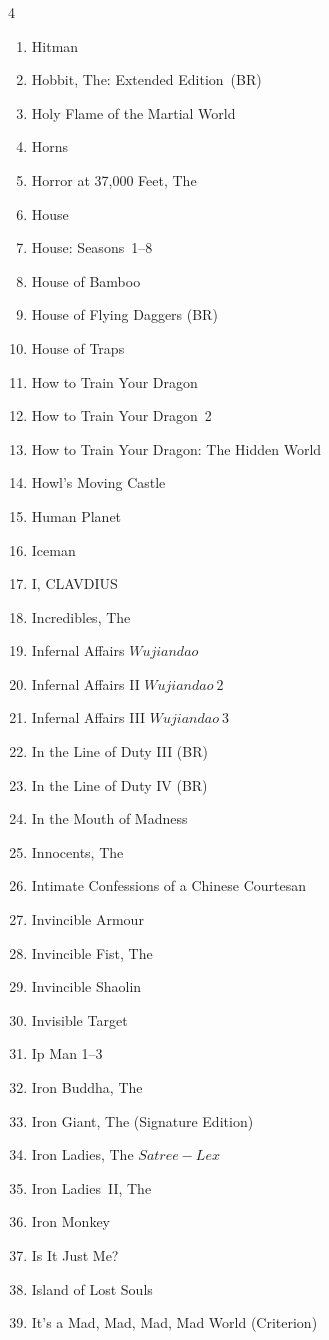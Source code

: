 \documentclass{article}
\begin{document}
\begin{multicols}{4}
\begin{enumerate}
\item Hitman
\item Hobbit, The: Extended Edition~(BR)
\item Holy Flame of the Martial World
\item Horns
\item Horror at 37,000 Feet, The
\item House
\item House: Seasons~1--8
\item House of Bamboo
\item House of Flying Daggers (BR)
\item House of Traps
\item How to Train Your Dragon
\item How to Train Your Dragon~2
\item How to Train Your Dragon: The Hidden World
\item Howl's Moving Castle
\item Human Planet
\item Iceman
\item I, CLAVDIUS
\item Incredibles, The
\item Infernal Affairs \(Wu jian dao\)
\item Infernal Affairs II  \(Wu jian dao~2\)
\item Infernal Affairs III  \(Wu jian dao~3\)
\item In the Line of Duty III (BR)
\item In the Line of Duty IV (BR)
\item In the Mouth of Madness
\item Innocents, The
\item Intimate Confessions of a Chinese Courtesan
\item Invincible Armour
\item Invincible Fist, The
\item Invincible Shaolin
\item Invisible Target
\item Ip Man 1--3
\item Iron Buddha, The
\item Iron Giant, The (Signature Edition)
\item Iron Ladies, The \(Satree-Lex\)
\item Iron Ladies~II, The
\item Iron Monkey
\item Is It Just Me?
\item Island of Lost Souls
\item It's a Mad, Mad, Mad, Mad World (Criterion)

\end{enumerate}
\end{multicols}
\end{document}

